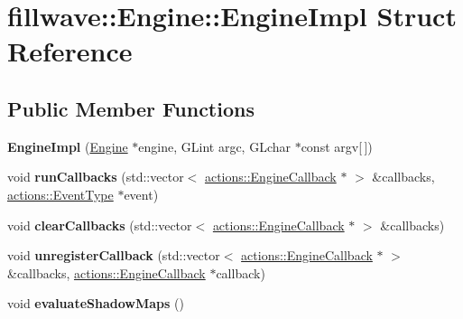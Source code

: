 \hypertarget{structfillwave_1_1Engine_1_1EngineImpl}{}\section{fillwave\+:\+:Engine\+:\+:Engine\+Impl Struct Reference}
\label{structfillwave_1_1Engine_1_1EngineImpl}
\subsection*{Public Member Functions}
\begin{DoxyCompactItemize}
\item 
\hypertarget{structfillwave_1_1Engine_1_1EngineImpl_a6c76291596614e9197fd6bce3504719a}{}{\bfseries Engine\+Impl} (\hyperlink{classfillwave_1_1Engine}{Engine} $\ast$engine, G\+Lint argc, G\+Lchar $\ast$const argv\mbox{[}$\,$\mbox{]})\label{structfillwave_1_1Engine_1_1EngineImpl_a6c76291596614e9197fd6bce3504719a}

\item 
\hypertarget{structfillwave_1_1Engine_1_1EngineImpl_a3dd4c55ebb97c77dfabbcc712eb91955}{}void {\bfseries run\+Callbacks} (std\+::vector$<$ \hyperlink{classfillwave_1_1actions_1_1EngineCallback}{actions\+::\+Engine\+Callback} $\ast$ $>$ \&callbacks, \hyperlink{classfillwave_1_1actions_1_1EventType}{actions\+::\+Event\+Type} $\ast$event)\label{structfillwave_1_1Engine_1_1EngineImpl_a3dd4c55ebb97c77dfabbcc712eb91955}

\item 
\hypertarget{structfillwave_1_1Engine_1_1EngineImpl_a4dbaa280c45297e1cb25ee71d039fb08}{}void {\bfseries clear\+Callbacks} (std\+::vector$<$ \hyperlink{classfillwave_1_1actions_1_1EngineCallback}{actions\+::\+Engine\+Callback} $\ast$ $>$ \&callbacks)\label{structfillwave_1_1Engine_1_1EngineImpl_a4dbaa280c45297e1cb25ee71d039fb08}

\item 
\hypertarget{structfillwave_1_1Engine_1_1EngineImpl_a1ed150cea5ab2fb1d4c8df17bb2ac950}{}void {\bfseries unregister\+Callback} (std\+::vector$<$ \hyperlink{classfillwave_1_1actions_1_1EngineCallback}{actions\+::\+Engine\+Callback} $\ast$ $>$ \&callbacks, \hyperlink{classfillwave_1_1actions_1_1EngineCallback}{actions\+::\+Engine\+Callback} $\ast$callback)\label{structfillwave_1_1Engine_1_1EngineImpl_a1ed150cea5ab2fb1d4c8df17bb2ac950}

\item 
\hypertarget{structfillwave_1_1Engine_1_1EngineImpl_aeed21a166f13fbd4ef783db853836750}{}void {\bfseries evaluate\+Shadow\+Maps} ()\label{structfillwave_1_1Engine_1_1EngineImpl_aeed21a166f13fbd4ef783db853836750}


\end{DoxyCompactItemize}
